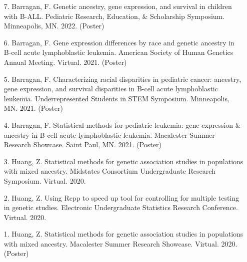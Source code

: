 \documentclass[margin]{res}
\begin{document}
\begin{resume}
\begin{itemize}
\item[7.] Barragan, F.  Genetic ancestry, gene expression, and survival in children with B-ALL. Pediatric Research, Education, \& Scholarship Symposium. Minneapolis, MN. 2022. (Poster)


\item[6.] Barragan, F.  Gene expression differences by race and genetic ancestry in B-cell acute lymphoblastic leukemia. American Society of Human Genetics Annual Meeting. Virtual. 2021. (Poster)

\item[5.] Barragan, F.  Characterizing racial disparities in pediatric cancer: ancestry, gene expression, and survival disparities in B-cell acute lymphoblastic leukemia. Underrepresented Students in STEM Symposium. Minneapolis, MN. 2021. (Poster)

\item[4.] Barragan, F.  Statistical methods for pediatric leukemia: gene expression \& ancestry in B-cell acute lymphoblastic leukemia. Macalester Summer Research Showcase. Saint Paul, MN. 2021. (Poster)


\item[3.] Huang, Z. Statistical methods for genetic association studies in populations with mixed ancestry. Midstates Consortium Undergraduate Research Symposium. Virtual. 2020.

\item[2.] Huang, Z. Using Rcpp to speed up tool for controlling for multiple testing in genetic studies. Electronic Undergraduate Statistics Research Conference. Virtual. 2020.

\item[1.] Huang, Z. Statistical methods for genetic association studies in populations with mixed ancestry. Macalester Summer Research Showcase. Virtual. 2020. (Poster) \\

\end{itemize}





\end{resume}
\end{document}
